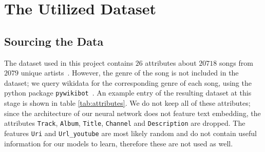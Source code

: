 \documentclass[
  12pt,
  bibliography=totoc,     %
  captions=tableheading,  %
  titlepage=firstiscover, %
]{scrartcl}
\begin{document}
\section{The Utilized Dataset}
\subsection{Sourcing the Data}
The dataset used in this project contains $26$ attributes about $20718$ songs from $2079$ unique artists~\cite{Datensatz}.
However, the genre of the song is not included in the dataset; we query wikidata for the corresponding genre of each song,
using the python package \texttt{pywikibot}~\cite{pywikibot}. An example entry of the resulting dataset at this stage
is shown in table \ref{tab:attributes}. We do not keep all of these attributes; since the architecture of our
neural network does not feature text embedding, the attributes \texttt{Track}, \texttt{Album}, \texttt{Title}, \texttt{Channel} and
\texttt{Description} are dropped. The features \texttt{Uri} and \texttt{Url\_youtube} are most likely random and do not contain
useful information for our models to learn, therefore these are not used as well.
\FloatBarrier
\end{document}
